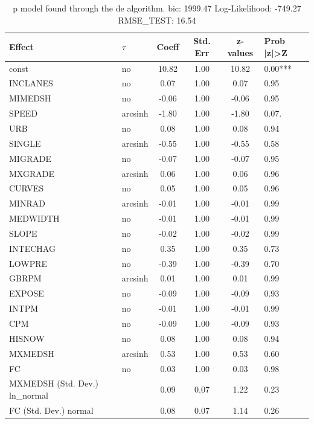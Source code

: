 \begin{table}
	\caption{p model found through the de algorithm. bic: 1999.47 Log-Likelihood: -749.27 RMSE_TEST: 16.54}
	\begin{center}
		\begin{tabular}{|l|l|c|c|c|l|}
			\hline
			Effect & $\tau$ & Coeff & Std. Err & z-values & Prob |z|>Z \\
			\hline
			const & no & 10.82 & 1.00 & 10.82 & 0.00*** \\
			\hline
			INCLANES & no & 0.07 & 1.00 & 0.07 & 0.95 \\
			\hline
			MIMEDSH & no & -0.06 & 1.00 & -0.06 & 0.95 \\
			\hline
			SPEED & arcsinh & -1.80 & 1.00 & -1.80 & 0.07. \\
			\hline
			URB & no & 0.08 & 1.00 & 0.08 & 0.94 \\
			\hline
			SINGLE & arcsinh & -0.55 & 1.00 & -0.55 & 0.58 \\
			\hline
			MIGRADE & no & -0.07 & 1.00 & -0.07 & 0.95 \\
			\hline
			MXGRADE & arcsinh & 0.06 & 1.00 & 0.06 & 0.96 \\
			\hline
			CURVES & no & 0.05 & 1.00 & 0.05 & 0.96 \\
			\hline
			MINRAD & arcsinh & -0.01 & 1.00 & -0.01 & 0.99 \\
			\hline
			MEDWIDTH & no & -0.01 & 1.00 & -0.01 & 0.99 \\
			\hline
			SLOPE & no & -0.02 & 1.00 & -0.02 & 0.99 \\
			\hline
			INTECHAG & no & 0.35 & 1.00 & 0.35 & 0.73 \\
			\hline
			LOWPRE & no & -0.39 & 1.00 & -0.39 & 0.70 \\
			\hline
			GBRPM & arcsinh & 0.01 & 1.00 & 0.01 & 0.99 \\
			\hline
			EXPOSE & no & -0.09 & 1.00 & -0.09 & 0.93 \\
			\hline
			INTPM & no & -0.01 & 1.00 & -0.01 & 0.99 \\
			\hline
			CPM & no & -0.09 & 1.00 & -0.09 & 0.93 \\
			\hline
			HISNOW & no & 0.08 & 1.00 & 0.08 & 0.94 \\
			\hline
			MXMEDSH & arcsinh & 0.53 & 1.00 & 0.53 & 0.60 \\
			\hline
			FC & no & 0.03 & 1.00 & 0.03 & 0.98 \\
			\hline
			MXMEDSH (Std. Dev.) ln_normal &  & 0.09 & 0.07 & 1.22 & 0.23 \\
			\hline
			FC (Std. Dev.) normal &  & 0.08 & 0.07 & 1.14 & 0.26 \\
			\hline
		\end{tabular}
	\end{center}
\end{table}